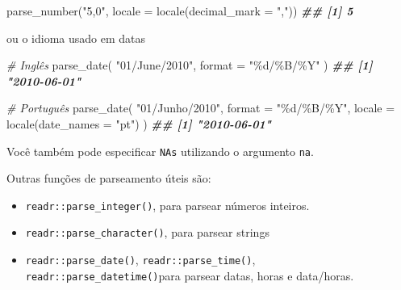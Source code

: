 \documentclass[
]{book}
\newenvironment{Shaded}{\begin{snugshade}}{\end{snugshade}}
\newcommand{\AttributeTok}[1]{\textcolor[rgb]{0.77,0.63,0.00}{#1}}
\newcommand{\CommentTok}[1]{\textcolor[rgb]{0.56,0.35,0.01}{\textit{#1}}}
\newcommand{\DocumentationTok}[1]{\textcolor[rgb]{0.56,0.35,0.01}{\textbf{\textit{#1}}}}
\newcommand{\FunctionTok}[1]{\textcolor[rgb]{0.00,0.00,0.00}{#1}}
\newcommand{\NormalTok}[1]{#1}
\newcommand{\StringTok}[1]{\textcolor[rgb]{0.31,0.60,0.02}{#1}}
\providecommand{\tightlist}{%
  \setlength{\itemsep}{0pt}\setlength{\parskip}{0pt}}
\begin{document}
\begin{Shaded}
\begin{Highlighting}[]
\FunctionTok{parse\_number}\NormalTok{(}\StringTok{"5,0"}\NormalTok{, }\AttributeTok{locale =} \FunctionTok{locale}\NormalTok{(}\AttributeTok{decimal\_mark =} \StringTok{","}\NormalTok{))}
\DocumentationTok{\#\# [1] 5}
\end{Highlighting}
\end{Shaded}

ou o idioma usado em datas

\begin{Shaded}
\begin{Highlighting}[]
\CommentTok{\# Inglês}
\FunctionTok{parse\_date}\NormalTok{(}
  \StringTok{"01/June/2010"}\NormalTok{, }
  \AttributeTok{format =} \StringTok{"\%d/\%B/\%Y"}
\NormalTok{)}
\DocumentationTok{\#\# [1] "2010{-}06{-}01"}

\CommentTok{\# Português}
\FunctionTok{parse\_date}\NormalTok{(}
  \StringTok{"01/Junho/2010"}\NormalTok{, }
  \AttributeTok{format =} \StringTok{"\%d/\%B/\%Y"}\NormalTok{,}
  \AttributeTok{locale =} \FunctionTok{locale}\NormalTok{(}\AttributeTok{date\_names =} \StringTok{"pt"}\NormalTok{)}
\NormalTok{)}
\DocumentationTok{\#\# [1] "2010{-}06{-}01"}
\end{Highlighting}
\end{Shaded}

Você também pode especificar \texttt{NAs} utilizando o argumento \texttt{na}.

\begin{Shaded}
\end{Shaded}

Outras funções de parseamento úteis são:

\begin{itemize}
\tightlist
\item
  \texttt{readr::parse\_integer()}, para parsear números inteiros.
\item
  \texttt{readr::parse\_character()}, para parsear strings
\item
  \texttt{readr::parse\_date()}, \texttt{readr::parse\_time()}, \texttt{readr::parse\_datetime()}para parsear datas, horas e data/horas.
\end{itemize}
\end{document}
